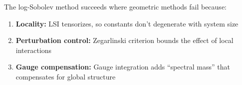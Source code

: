 \begin{remark}
The log-Sobolev method succeeds where geometric methods fail because:
\begin{enumerate}
\item \textbf{Locality:} LSI tensorizes, so constants don't degenerate with system size
\item \textbf{Perturbation control:} Zegarlinski criterion bounds the effect of 
local interactions
\item \textbf{Gauge compensation:} Gauge integration adds ``spectral mass'' that 
compensates for global structure
\end{enumerate}
\end{remark}








